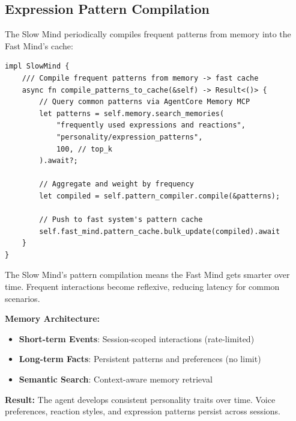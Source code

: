 \documentclass[11pt,letterpaper]{article}
\begin{document}
\subsection{Expression Pattern Compilation}

The Slow Mind periodically compiles frequent patterns from memory into the Fast Mind's cache:

\begin{lstlisting}[caption=Pattern Compilation]
impl SlowMind {
    /// Compile frequent patterns from memory -> fast cache
    async fn compile_patterns_to_cache(&self) -> Result<()> {
        // Query common patterns via AgentCore Memory MCP
        let patterns = self.memory.search_memories(
            "frequently used expressions and reactions",
            "personality/expression_patterns",
            100, // top_k
        ).await?;

        // Aggregate and weight by frequency
        let compiled = self.pattern_compiler.compile(&patterns);

        // Push to fast system's pattern cache
        self.fast_mind.pattern_cache.bulk_update(compiled).await
    }
}
\end{lstlisting}

\begin{keybox}
The Slow Mind's pattern compilation means the Fast Mind gets smarter over time. Frequent interactions become reflexive, reducing latency for common scenarios.
\end{keybox}

\begin{tcolorbox}[
  enhanced,
  colback=vcprimary!5,
  colframe=vcprimary!50,
  boxrule=1pt,
  arc=6pt,
  left=12pt, right=12pt, top=10pt, bottom=10pt,
  title={\textcolor{white}{\sffamily\bfseries Part V Summary: Memory \& Personality}},
  colbacktitle=vcprimary,
  partsummary
]
\small
\textbf{Memory Architecture:}
\begin{itemize}[nosep, leftmargin=1.2em]
  \item \textbf{Short-term Events}: Session-scoped interactions (rate-limited)
  \item \textbf{Long-term Facts}: Persistent patterns and preferences (no limit)
  \item \textbf{Semantic Search}: Context-aware memory retrieval
\end{itemize}

\vspace{0.5em}
\textcolor{coolgray}{\small\textbf{Result:} The agent develops consistent personality traits over time. Voice preferences, reaction styles, and expression patterns persist across sessions.}
\end{tcolorbox}
\end{document}
